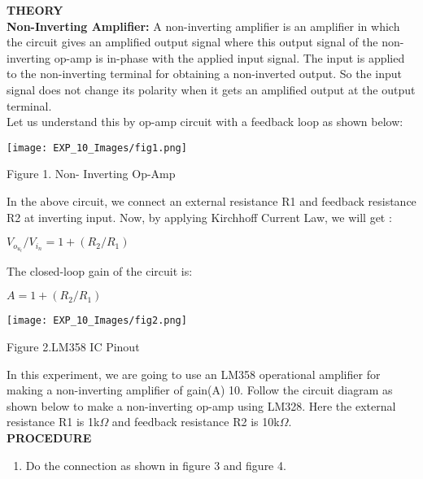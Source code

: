 \documentclass[12pt,a4paper]{article}
\begin{document}
\begin{justify}
\textbf{\large THEORY}\\[3pt]
\textbf{Non-Inverting Amplifier:  } A non-inverting amplifier is an amplifier in which the circuit gives an amplified output signal where this output signal of the non-inverting op-amp is in-phase with the applied input signal. The input is applied to the non-inverting terminal for obtaining a non-inverted output. So the input signal does not change its polarity when it gets an amplified output at the output terminal.\\
Let us understand this by op-amp circuit with a feedback loop as shown below:
\par

\begin{center} 
\texttt{[image: EXP\_10\_Images/fig1.png]}
\end{center}
\begin{center} {Figure 1. Non- Inverting Op-Amp}\end{center}

\noindent In the above circuit, we connect an external resistance R1 and feedback resistance R2 at inverting input. Now, by applying Kirchhoff Current Law, we will get :

\begin{center}  $ V_o_u_t/V_i_n= 1+(R_2/R_1) $  \end{center}


\noindent The closed-loop gain of the circuit is:
\begin{center} $ A= 1+(R_2/R_1) $ \end{center}


\begin{center} 
\texttt{[image: EXP\_10\_Images/fig2.png]}
\end{center}
\begin{center} {Figure 2.LM358 IC Pinout }\\[21pt]\end{center}

\noindent In this experiment, we are going to use an LM358 operational amplifier for making a non-inverting amplifier of gain(A) 10. Follow the circuit diagram as shown below to make a non-inverting op-amp using LM328. Here the external resistance R1 is 1k$\Omega$ and feedback resistance R2 is 10k$\Omega$.\\

\noindent \textbf{\large PROCEDURE}
\begin{enumerate}
\setlength\itemsep{-0.3em}
\item Do the connection as shown in figure 3 and figure 4. 


\end{enumerate}
\end{justify}
\end{document}
